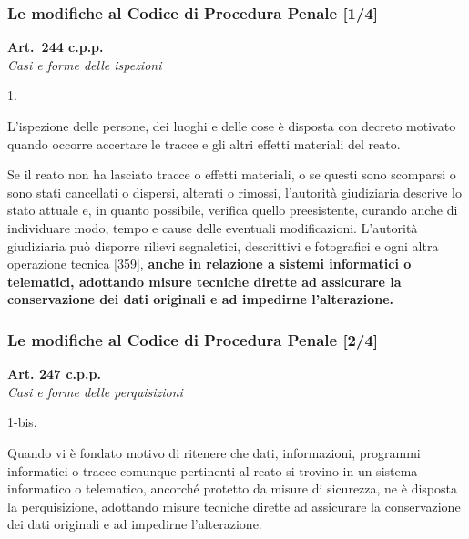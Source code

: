 \documentclass[11pt]{beamer}
\begin{document}
	\begin{frame}[shrink]
		\frametitle{Le modifiche al Codice di Procedura Penale [1/4]}
		\begin{center}
			\textbf{Art.~244 c.p.p.} \\\textit{Casi e forme delle ispezioni}	
		\end{center}		
			\begin{labeling}{1.}
				\item[1.] L'ispezione delle persone, dei luoghi e delle cose è disposta con decreto motivato quando occorre accertare le tracce e gli altri effetti materiali del reato.
				\item[2.] Se il reato non ha lasciato tracce o effetti materiali, o se questi sono scomparsi o sono stati cancellati o dispersi, alterati o rimossi, l'autorità giudiziaria descrive lo stato attuale e, in quanto possibile, verifica quello preesistente, curando anche di individuare modo, tempo e cause delle eventuali modificazioni. L'autorità giudiziaria può disporre rilievi segnaletici, descrittivi e fotografici e ogni altra operazione tecnica [359], \textbf{anche in relazione a sistemi informatici o telematici, adottando misure tecniche dirette ad assicurare la conservazione dei dati originali e ad impedirne l'alterazione.}
			\end{labeling}
	\end{frame}
	\begin{frame}[shrink]
		\frametitle{Le modifiche al Codice di Procedura Penale [2/4]}
			\begin{center}
				\textbf{Art. 247 c.p.p.} \\\textit{Casi e forme delle perquisizioni}
			\end{center}
			\begin{labeling}{1-bis.}
				\item[ \textellipsis ]
				\item[1-bis.] Quando vi è fondato motivo di ritenere che dati, informazioni, programmi informatici o tracce comunque pertinenti al reato si trovino in un sistema informatico o telematico, ancorché protetto da misure di sicurezza, ne è disposta la perquisizione, adottando misure tecniche dirette ad assicurare la conservazione dei dati originali e ad impedirne l'alterazione.
				\item[\textellipsis]
			\end{labeling}
	\end{frame}
\end{document}
